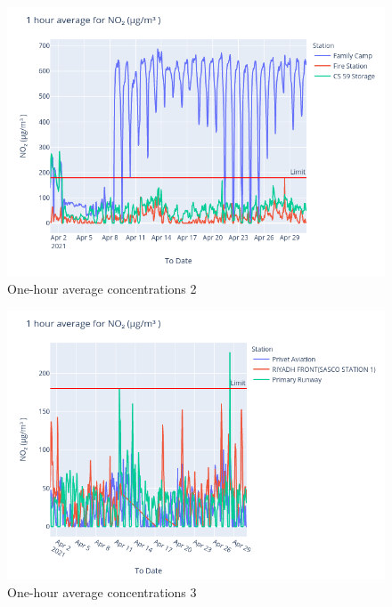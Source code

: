 \documentclass[12pt, oneside]{book}
\begin{document}
{\
{\begin{figure}[H]
\centering
\includegraphics[width=\textwidth]{image195}
\caption{One-hour average  concentrations 2}\label{image195}
\end{figure}}{}



{\begin{figure}[H]
\centering
\includegraphics[width=\textwidth]{image207}
\caption{One-hour average  concentrations 3}\label{image207}
\end{figure}}{}


}
\end{document}
